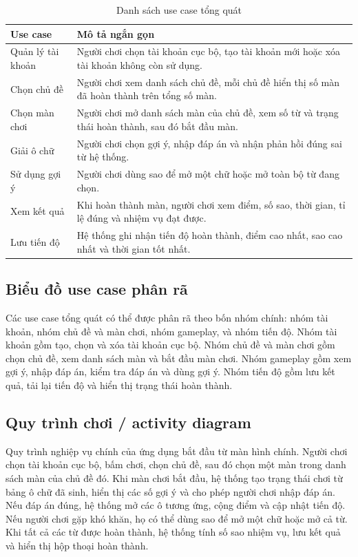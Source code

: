 \documentclass[../DoAn.tex]{subfiles}
\begin{document}
\begin{table}[H]
\centering
\begin{tabularx}{\textwidth}{|>{\RaggedRight\arraybackslash}p{4cm}|>{\RaggedRight\arraybackslash}X|}
\hline
\textbf{Use case} & \textbf{Mô tả ngắn gọn} \\ \hline
Quản lý tài khoản & Người chơi chọn tài khoản cục bộ, tạo tài khoản mới hoặc xóa tài khoản không còn sử dụng. \\ \hline
Chọn chủ đề & Người chơi xem danh sách chủ đề, mỗi chủ đề hiển thị số màn đã hoàn thành trên tổng số màn. \\ \hline
Chọn màn chơi & Người chơi mở danh sách màn của chủ đề, xem số từ và trạng thái hoàn thành, sau đó bắt đầu màn. \\ \hline
Giải ô chữ & Người chơi chọn gợi ý, nhập đáp án và nhận phản hồi đúng sai từ hệ thống. \\ \hline
Sử dụng gợi ý & Người chơi dùng sao để mở một chữ hoặc mở toàn bộ từ đang chọn. \\ \hline
Xem kết quả & Khi hoàn thành màn, người chơi xem điểm, số sao, thời gian, tỉ lệ đúng và nhiệm vụ đạt được. \\ \hline
Lưu tiến độ & Hệ thống ghi nhận tiến độ hoàn thành, điểm cao nhất, sao cao nhất và thời gian tốt nhất. \\ \hline
\end{tabularx}
\caption{Danh sách use case tổng quát}
\label{table:usecase_overview}
\end{table}

\subsection{Biểu đồ use case phân rã}
\label{subsection:2.2.2}
Các use case tổng quát có thể được phân rã theo bốn nhóm chính: nhóm tài khoản, nhóm chủ đề và màn chơi, nhóm gameplay, và nhóm tiến độ. Nhóm tài khoản gồm tạo, chọn và xóa tài khoản cục bộ. Nhóm chủ đề và màn chơi gồm chọn chủ đề, xem danh sách màn và bắt đầu màn chơi. Nhóm gameplay gồm xem gợi ý, nhập đáp án, kiểm tra đáp án và dùng gợi ý. Nhóm tiến độ gồm lưu kết quả, tải lại tiến độ và hiển thị trạng thái hoàn thành.


\subsection{Quy trình chơi / activity diagram}
\label{subsection:2.2.3}
Quy trình nghiệp vụ chính của ứng dụng bắt đầu từ màn hình chính. Người chơi chọn tài khoản cục bộ, bấm chơi, chọn chủ đề, sau đó chọn một màn trong danh sách màn của chủ đề đó. Khi màn chơi bắt đầu, hệ thống tạo trạng thái chơi từ bảng ô chữ đã sinh, hiển thị các số gợi ý và cho phép người chơi nhập đáp án. Nếu đáp án đúng, hệ thống mở các ô tương ứng, cộng điểm và cập nhật tiến độ. Nếu người chơi gặp khó khăn, họ có thể dùng sao để mở một chữ hoặc mở cả từ. Khi tất cả các từ được hoàn thành, hệ thống tính số sao nhiệm vụ, lưu kết quả và hiển thị hộp thoại hoàn thành.
\end{document}

